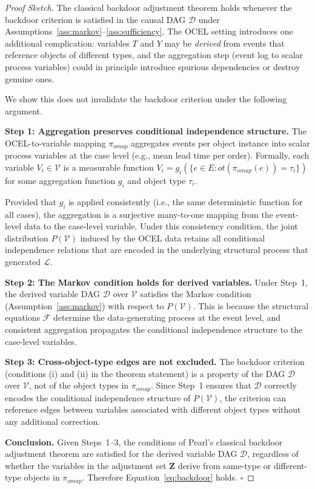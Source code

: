 \begin{proof}[Proof Sketch]
The classical backdoor adjustment theorem \citep[Theorem~3.3.2]{pearl2009causality}
holds whenever the backdoor criterion is satisfied in the causal DAG $\mathcal{D}$
under Assumptions~\ref{ass:markov}--\ref{ass:sufficiency}. The OCEL setting
introduces one additional complication: variables $T$ and $Y$ may be
\emph{derived} from events that reference objects of different types, and the
aggregation step (event log to scalar process variables) could in principle
introduce spurious dependencies or destroy genuine ones.

We show this does not invalidate the backdoor criterion under the following
argument.

\medskip
\noindent\textbf{Step 1: Aggregation preserves conditional independence structure.}
The OCEL-to-variable mapping $\pi_{\mathit{omap}}$ aggregates events per
object instance into scalar process variables at the case level (e.g., mean
lead time per order). Formally, each variable $V_i \in \mathcal{V}$ is a
measurable function $V_i = g_i(\{e \in E : \mathit{ot}(\pi_{\mathit{omap}}(e))
= \tau_i\})$ for some aggregation function $g_i$ and object type $\tau_i$.

Provided that $g_i$ is applied consistently (i.e., the same deterministic
function for all cases), the aggregation is a surjective many-to-one mapping
from the event-level data to the case-level variable. Under this consistency
condition, the joint distribution $P(\mathcal{V})$ induced by the OCEL data
retains all conditional independence relations that are encoded in the
underlying structural process that generated $\mathcal{L}$.

\medskip
\noindent\textbf{Step 2: The Markov condition holds for derived variables.}
Under Step~1, the derived variable DAG $\mathcal{D}$ over $\mathcal{V}$
satisfies the Markov condition (Assumption~\ref{ass:markov}) with respect to
$P(\mathcal{V})$. This is because the structural equations $\mathcal{F}$
determine the data-generating process at the event level, and consistent
aggregation propagates the conditional independence structure to the
case-level variables.

\medskip
\noindent\textbf{Step 3: Cross-object-type edges are not excluded.}
The backdoor criterion (conditions (i) and (ii) in the theorem statement) is
a property of the DAG $\mathcal{D}$ over $\mathcal{V}$, not of the object
types in $\pi_{\mathit{omap}}$. Since Step~1 ensures that $\mathcal{D}$
correctly encodes the conditional independence structure of $P(\mathcal{V})$,
the criterion can reference edges between variables associated with different
object types without any additional correction.

\medskip
\noindent\textbf{Conclusion.} Given Steps~1--3, the conditions of Pearl's
classical backdoor adjustment theorem are satisfied for the derived variable
DAG $\mathcal{D}$, regardless of whether the variables in the adjustment
set $\mathbf{Z}$ derive from same-type or different-type objects in
$\pi_{\mathit{omap}}$. Therefore Equation~\eqref{eq:backdoor} holds.
$\square$
\end{proof}

